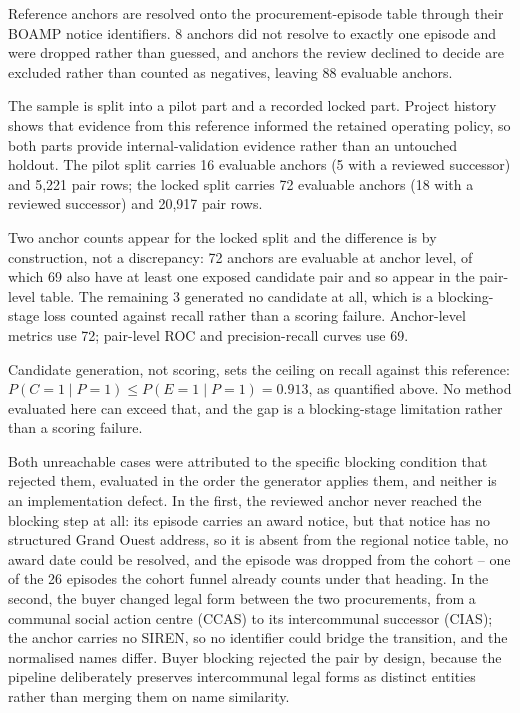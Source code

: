 \documentclass[11pt,a4paper]{article}
\begin{document}
Reference anchors are resolved onto the procurement-episode table through their
BOAMP notice identifiers.
8 anchors did
not resolve to exactly one episode and were dropped rather than guessed, and
anchors the review declined to decide are excluded rather than counted as
negatives, leaving 88 evaluable anchors.

The sample is split into a pilot part and a recorded locked part. Project history
shows that evidence from this reference informed the retained operating policy,
so both parts provide internal-validation evidence rather than an untouched
holdout. The pilot split carries
16 evaluable anchors
(5 with a reviewed successor) and
5,221 pair rows; the locked split carries
72 evaluable anchors
(18 with a reviewed successor) and
20,917 pair rows.

Two anchor counts appear for the locked split and the difference is by
construction, not a discrepancy: 72 anchors
are evaluable at anchor level, of which
69 also have at least one exposed
candidate pair and so appear in the pair-level table. The remaining
3
generated no candidate at all, which is a blocking-stage loss counted against
recall rather than a scoring failure. Anchor-level metrics use
72; pair-level ROC and precision-recall
curves use 69.

Candidate generation, not scoring, sets the ceiling on recall against this
reference: \(P(C=1\mid P=1)\le P(E=1\mid P=1)=0.913\),
as quantified above. No method evaluated here can exceed that, and the gap is a
blocking-stage limitation rather than a scoring failure.

Both unreachable cases were attributed to the specific blocking condition that
rejected them, evaluated in the order the generator applies them, and neither is
an implementation defect. In the first, the reviewed anchor never reached the
blocking step at all: its episode carries an award notice, but that notice has no
structured Grand Ouest address, so it is absent from the regional notice table,
no award date could be resolved, and the episode was dropped from the cohort --
one of the 26
episodes the cohort funnel already counts under that heading. In the second, the
buyer changed legal form between the two procurements, from a communal social
action centre (CCAS) to its intercommunal successor (CIAS); the anchor carries no
SIREN, so no identifier could bridge the transition, and the normalised names
differ. Buyer blocking rejected the pair by design, because the pipeline
deliberately preserves intercommunal legal forms as distinct entities rather than
merging them on name similarity.
\end{document}
